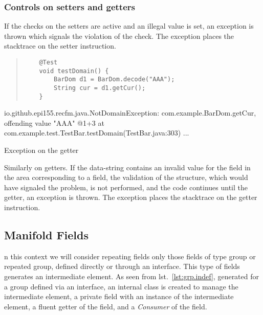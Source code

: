 \documentclass[a4paper,10pt]{report}
\newenvironment{elisting}[1][H]
  {\captionsetup{aboveskip=0pt}\begin{listing}[#1]}
  {\end{listing}%
}
\begin{document}
\subsubsection*{Controls on setters and getters}
If the checks on the setters are active and an illegal value is set, an 
exception is thrown which signals the violation of the check. The exception 
places the stacktrace on the setter instruction.

\begin{elisting}[!htb]
\begin{quote}
\begin{verbatim}
    @Test
    void testDomain() {
        BarDom d1 = BarDom.decode("AAA");
        String cur = d1.getCur();
    }
\end{verbatim}
\end{quote}
\vspace*{-1cm}
\begin{javacode}
io.github.epi155.recfm.java.NotDomainException: com.example.BarDom.getCur, offending value "AAA" @1+3
	at com.example.test.TestBar.testDomain(TestBar.java:303)
	...
\end{javacode}
\caption{Exception on the getter}
\label{lst:get.throw}
\end{elisting}
Similarly on getters. If the data-string contains an invalid value for the field 
in the area corresponding to a field, the validation of the structure, which 
would have signaled the problem, is not performed, and the code continues until 
the getter, an exception is thrown. The exception places the stacktrace on the 
getter instruction.

\subsection{Manifold Fields}
n this context we will consider repeating fields only those fields of type group 
or repeated group, defined directly or through an interface. 
This type of fields generates an intermediate element. 
As seen from lst.~\ref{lst:grp.indef}, generated for a group defined via an 
interface, an internal class is created to manage the intermediate element, a 
private field with an instance of the intermediate element, a fluent getter of 
the field, and a \textit{Consumer} of the field.
\end{document}
